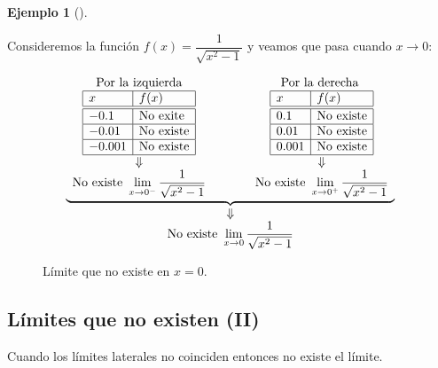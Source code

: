 \documentclass[
  a4paper,
]{scrreport}
\theoremstyle{definition}
\theoremstyle{definition}
\newtheorem{example}{Ejemplo}[chapter]
\theoremstyle{definition}
\theoremstyle{plain}
\theoremstyle{plain}
\theoremstyle{plain}
\theoremstyle{remark}
\begin{document}
\begin{example}[]\protect\hypertarget{exm-limites-no-existen}{}\label{exm-limites-no-existen}

Consideremos la función \(f(x)=\dfrac{1}{\sqrt{x^2-1}}\) y veamos que
pasa cuando \(x\to 0\):

\[
\begin{array}{c}
\underbrace{\begin{array}{ccc}
\mbox{Por la izquierda} & \qquad & \mbox{Por la derecha }\\
\begin{array}{|l|l|}
\hline
x      & f(x)   \\
\hline\hline
 -0.1   & \mbox{No exite}      \\
\hline
 -0.01   & \mbox{No existe}     \\
\hline
 -0.001  & \mbox{No existe}   \\
\hline
\end{array}
& &
\begin{array}{|l|l|}
\hline
x      & f(x)   \\
\hline\hline
 0.1    &  \mbox{No existe}      \\
\hline
 0.01   & \mbox{No existe}    \\
\hline
 0.001  & \mbox{No existe}   \\
\hline
\end{array}\\
\Downarrow & & \Downarrow\\
\displaystyle \mbox{No existe } \lim_{x\to 0^-}\frac{1}{\sqrt{x^2-1}}
& &
\displaystyle \mbox{No existe } \lim_{x\to 0^+}\frac{1}{\sqrt{x^2-1}}
\end{array}}\\
\Downarrow\\
\displaystyle \mbox{No existe }\lim_{x\to 0}\frac{1}{\sqrt{x^2-1}}
\end{array}\]

\begin{figure}
\centering

\caption{Límite que no existe en \(x=0\).}
\end{figure}

\end{example}

\subsection{Límites que no existen
(II)}\label{luxedmites-que-no-existen-ii}

Cuando los límites laterales no coinciden entonces no existe el límite.
\end{document}
